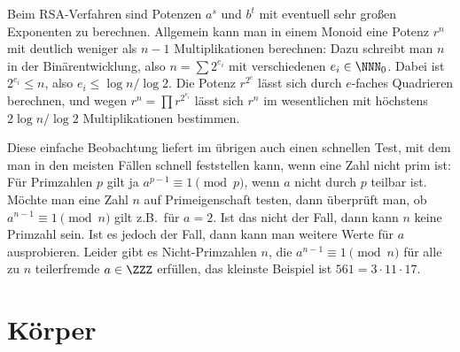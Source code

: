 \documentclass[12pt,a4paper,twoside]{article}
\begin{document}
Beim RSA-Verfahren sind Potenzen $a^s$ und $b^t$ mit eventuell sehr gro\ss en
Exponenten zu berechnen. Allgemein kann man in einem Monoid eine Potenz $r^n$
mit deutlich weniger als $n-1$ Multiplikationen berechnen: Dazu schreibt man
$n$ in der Bin\"arentwicklung, also $n=\sum 2^{e_i}$ mit verschiedenen
$e_i\in\NNN_0$. Dabei ist $2^{e_i}\le n$, also $e_i\le\log n/\log 2$. Die
Potenz $r^{2^e}$ l\"asst sich durch $e$-faches Quadrieren berechnen, und wegen
$r^n=\prod r^{2^{e_i}}$ l\"asst sich $r^n$ im wesentlichen mit h\"ochstens
$2\log n/\log 2$ Multiplikationen bestimmen.

Diese einfache Beobachtung liefert im \"ubrigen auch einen schnellen Test, mit
dem man in den meisten F\"allen schnell feststellen kann, wenn eine Zahl nicht
prim ist: F\"ur Primzahlen $p$ gilt ja $a^{p-1}\equiv 1\pmod{p}$, wenn $a$
nicht durch $p$ teilbar ist. M\"ochte man eine Zahl $n$ auf Primeigenschaft
testen, dann \"uberpr\"uft man, ob $a^{n-1}\equiv 1\pmod{n}$ gilt z.B.\ f\"ur
$a=2$. Ist das nicht der Fall, dann kann $n$ keine Primzahl sein. Ist es
jedoch der Fall, dann kann man weitere Werte f\"ur $a$ ausprobieren. Leider
gibt es Nicht-Primzahlen $n$, die $a^{n-1}\equiv 1\pmod{n}$ f\"ur alle zu $n$
teilerfremde $a\in\ZZZ$ erf\"ullen, das kleinste Beispiel ist $561=3\cdot
11\cdot 17$.


\section{K\"orper}
\printindex 
%
%
%

\end{document}
